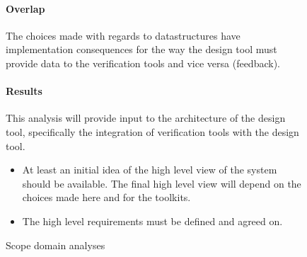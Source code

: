 \begin{figure}[!h]
{\begin{boxedminipage}[b]{.32\textwidth}
{	    \paragraph{Overlap} The choices made with regards to datastructures have
	    implementation consequences for the way the design tool must provide data to the
	    verification tools and vice versa (feedback).
	    \paragraph{Results} This analysis will provide input to the architecture of the
	    design tool, specifically the integration of verification tools with the design
	    tool.
	}%
    \end{boxedminipage}
    }%

    \begin{boxedminipage}[c]{.98\textwidth}
    \begin{itemize}
	\item At least an initial idea of the high level view of the system
		should be available. The final high level
		view will depend on the choices made here and for the toolkits.
	\item The high level requirements must be defined and agreed on.
    \end{itemize}
    \end{boxedminipage}


    \caption{Scope domain analyses}
    \label{fig: domain-analysis}
\end{figure}
